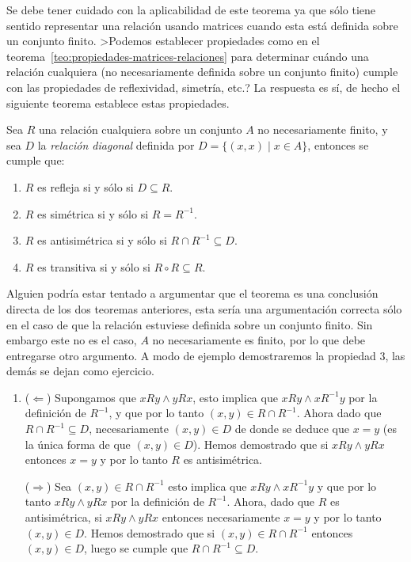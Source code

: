Se debe tener cuidado con la aplicabilidad de este teorema ya que sólo tiene sentido representar una relación usando matrices cuando esta está definida sobre un conjunto finito.
>Podemos establecer propiedades como en el teorema~\ref{teo:propiedades-matrices-relaciones} para determinar cuándo una relación cualquiera (no necesariamente definida sobre un conjunto finito) cumple con las propiedades de reflexividad, simetría, etc.? 
La respuesta es sí, de hecho el siguiente teorema establece estas propiedades.

\begin{teorema}
\label{teo:propiedades-relaciones}
Sea $R$ una relación cualquiera sobre un conjunto $A$ no necesariamente finito, y sea $D$ la \emph{relación diagonal} definida por $D=\{(x,x)\;|\; x\in A\}$, entonces se cumple que:
\begin{enumerate}
  \itemsep 0pt
  \item $R$ es refleja si y sólo si $D\subseteq R$.
  \item $R$ es simétrica si y sólo si $R=R^{-1}$.
  \item $R$ es antisimétrica si y sólo si $R\cap R^{-1}\subseteq D$.
  \item $R$ es transitiva si y sólo si $R\circ R\subseteq R$.
\end{enumerate}
\begin{demostracion}
Alguien podría estar tentado a argumentar que el teorema es una conclusión directa de los dos teoremas anteriores, esta sería una argumentación correcta sólo en el caso de que la relación estuviese definida sobre un conjunto finito.
Sin embargo este no es el caso, $A$ no necesariamente es finito, por lo que debe entregarse otro argumento.
A modo de ejemplo demostraremos la propiedad 3, las demás se dejan como ejercicio.
\begin{enumerate}
  \itemsep 0pt
  \item ($\Leftarrow$) Supongamos que $xRy\wedge yRx$, esto implica que $xRy\wedge xR^{-1}y$ por la definición de $R^{-1}$, y que por lo tanto $(x,y)\in R\cap R^{-1}$.
  Ahora dado que $R\cap R^{-1}\subseteq D$, necesariamente $(x,y)\in D$ de donde se deduce que $x=y$ (es la única forma de que $(x,y)\in D$).
  Hemos demostrado que si $xRy\wedge yRx$ entonces $x=y$ y por lo tanto $R$ es antisimétrica.
  
  ($\Rightarrow$) Sea $(x,y)\in R\cap R^{-1}$ esto implica que $xRy\wedge xR^{-1}y$ y que por lo tanto $xRy\wedge yRx$ por la definición de $R^{-1}$.
  Ahora, dado que $R$ es antisimétrica, si $xRy\wedge yRx$ entonces necesariamente $x=y$ y por lo tanto $(x,y)\in D$.
  Hemos demostrado que si $(x,y)\in R\cap R^{-1}$ entonces $(x,y)\in D$, luego se cumple que $R\cap R^{-1}\subseteq D$.
\end{enumerate}
\end{demostracion}


\end{teorema}
